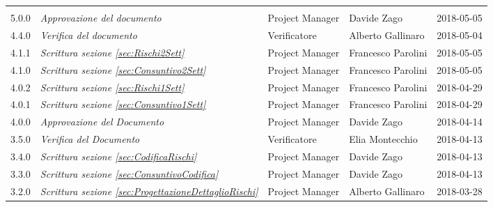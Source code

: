 \newpage 
\section*{}
	\begin{longtable}[H]{C{2cm}|C{4cm}|C{3cm}|C{3cm}|R{2cm}}
		
		 & & & &  \\
		
		
		5.0.0 &\emph{Approvazione del documento} & Project Manager & Davide Zago & 2018-05-05 \\
		\hline
		
		4.4.0 &\emph{Verifica del documento} & Verificatore & Alberto Gallinaro & 2018-05-04 \\
		\hline
		
		4.1.1 &\emph{Scrittura sezione \ref{sec:Rischi2Sett}} & Project Manager & Francesco Parolini & 2018-05-05 \\
		\hline
		
		4.1.0 &\emph{Scrittura sezione \ref{sec:Consuntivo2Sett}} & Project Manager & Francesco Parolini & 2018-05-05 \\
		\hline
		
		4.0.2 &\emph{Scrittura sezione \ref{sec:Rischi1Sett}} & Project Manager & Francesco Parolini & 2018-04-29 \\
		\hline
			
		4.0.1 &\emph{Scrittura sezione \ref{sec:Consuntivo1Sett}} & Project Manager & Francesco Parolini & 2018-04-29 \\
		\hline
		
		4.0.0 &\emph{Approvazione del Documento} & Project Manager & Davide Zago & 2018-04-14 \\
		\hline
		
		3.5.0 &\emph{Verifica del Documento} & Verificatore & Elia Montecchio & 2018-04-13 \\
		\hline
		
		3.4.0 &\emph{Scrittura sezione \ref{sec:CodificaRischi}} & Project Manager &  Davide Zago & 2018-04-13 \\
		\hline
		
		3.3.0 &\emph{Scrittura sezione \ref{sec:ConsuntivoCodifica}} & Project Manager &  Davide Zago & 2018-04-13 \\
		\hline

		3.2.0 &\emph{Scrittura sezione \ref{sec:ProgettazioneDettaglioRischi}} & Project Manager & Alberto Gallinaro & 2018-03-28 \\
		\hline	
		

\end{longtable}
